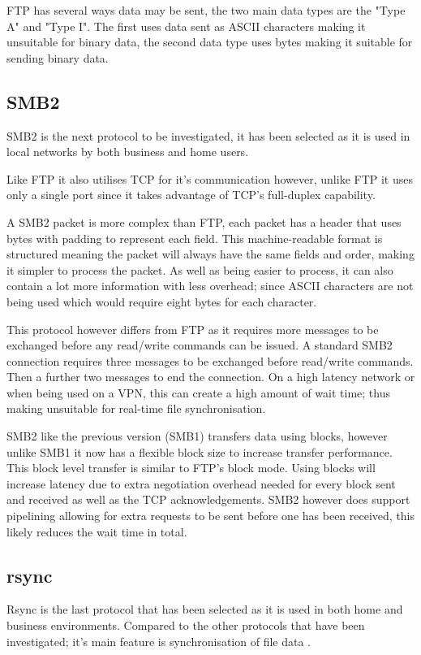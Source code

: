 FTP has several ways data may be sent, the two main data types are the "Type A" and "Type I". The first uses data sent as ASCII characters making it unsuitable for binary data, the second data type uses bytes making it suitable for sending binary data.

\subsection*{SMB2}
SMB2 is the next protocol to be investigated, it has been selected as it is used in local networks by both business and home users.

Like FTP it also utilises TCP for it's communication however, unlike FTP it uses only a single port since it takes advantage of TCP's full-duplex capability.

A SMB2 packet is more complex than FTP, each packet has a header that uses bytes with padding to represent each field. This machine-readable format is structured meaning the packet will always have the same fields and order, making it simpler to process the packet. As well as being easier to process, it can also contain a lot more information with less overhead; since ASCII characters are not being used which would require eight bytes for each character.

This protocol however differs from FTP as it requires more messages to be exchanged before any read/write commands can be issued. A standard SMB2 connection requires three messages to be exchanged before read/write commands. Then a further two messages to end the connection. On a high latency network or when being used on a VPN, this can create a high amount of wait time; thus making unsuitable for real-time file synchronisation.


SMB2 like the previous version (SMB1) transfers data using blocks, however unlike SMB1 it now has a flexible block size to increase transfer performance. This block level transfer is similar to FTP's block mode. Using blocks will increase latency due to extra negotiation overhead needed for every block sent and received as well as the TCP acknowledgements. SMB2 however does support pipelining allowing for extra requests to be sent before one has been received, this likely reduces the wait time in total.

\subsection*{rsync}
Rsync is the last protocol that has been selected as it is used in both home and business environments. Compared to the other protocols that have been investigated; it's main feature is synchronisation of file data \parencite{rsync-samba}.

